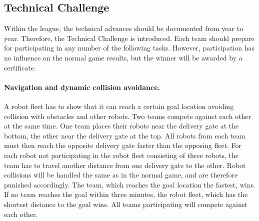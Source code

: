 \documentclass[12pt,twoside]{article}
\begin{document}
\subsection{Technical Challenge}
\label{sec:technical-challenge}
Within the league, the technical advances should be documented from
year to year. Therefore, the Technical Challenge is introduced. Each
team should prepare for participating in any number of the following
tasks. However, participation has no influence on the normal game
results, but the winner will be awarded by a certificate.


\paragraph{Navigation and dynamic collision avoidance.~}
A robot fleet has to show that it can reach a certain goal location avoiding collision with obstacles and other robots. Two teams compete against each other at the same time. One team places their robots near the delivery gate at the bottom, the other near the delivery gate at the top. All robots from each team must then reach the opposite delivery gate faster than the opposing fleet. For each robot not participating in the robot fleet consisting of three robots, the team has to travel another distance from one delivery gate to the other. Robot collisions will be handled the same as in the normal game, and are therefore punished accordingly. The team, which reaches the goal location the fastest, wins. If no team reaches the goal within three minutes, the robot fleet, which has the shortest distance to the goal wins. All teams participating will compete against each other.

\end{document}
